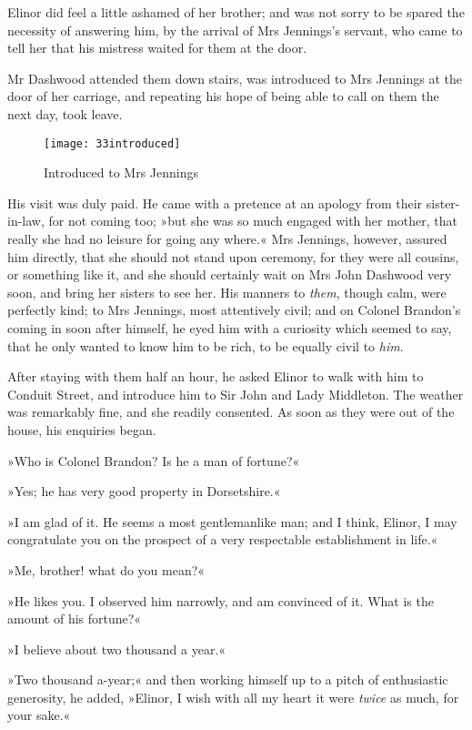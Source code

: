 Elinor did feel a little ashamed of her brother; and was not sorry to be spared the necessity of answering him, by the arrival of Mrs Jennings’s servant, who came to tell her that his mistress waited for them at the door.

Mr Dashwood attended them down stairs, was introduced to Mrs Jennings at the door of her carriage, and repeating his hope of being able to call on them the next day, took leave.

\begin{figure}[tbph]
\centering
\texttt{[image: 33introduced]}
\caption{Introduced to Mrs Jennings}
\end{figure}

His visit was duly paid. He came with a pretence at an apology from their sister-in-law, for not coming too; »but she was so much engaged with her mother, that really she had no leisure for going any where.« Mrs Jennings, however, assured him directly, that she should not stand upon ceremony, for they were all cousins, or something like it, and she should certainly wait on Mrs John Dashwood very soon, and bring her sisters to see her. His manners to \textit{them}, though calm, were perfectly kind; to Mrs Jennings, most attentively civil; and on Colonel Brandon’s coming in soon after himself, he eyed him with a curiosity which seemed to say, that he only wanted to know him to be rich, to be equally civil to \textit{him}.

After staying with them half an hour, he asked Elinor to walk with him to Conduit Street, and introduce him to Sir John and Lady Middleton. The weather was remarkably fine, and she readily consented. As soon as they were out of the house, his enquiries began.

»Who is Colonel Brandon? Is he a man of fortune?«

»Yes; he has very good property in Dorsetshire.«

»I am glad of it. He seems a most gentlemanlike man; and I think, Elinor, I may congratulate you on the prospect of a very respectable establishment in life.«

»Me, brother! what do you mean?«

»He likes you. I observed him narrowly, and am convinced of it. What is the amount of his fortune?«

»I believe about two thousand a year.«

»Two thousand a-year;« and then working himself up to a pitch of enthusiastic generosity, he added, »Elinor, I wish with all my heart it were \textit{twice} as much, for your sake.«

